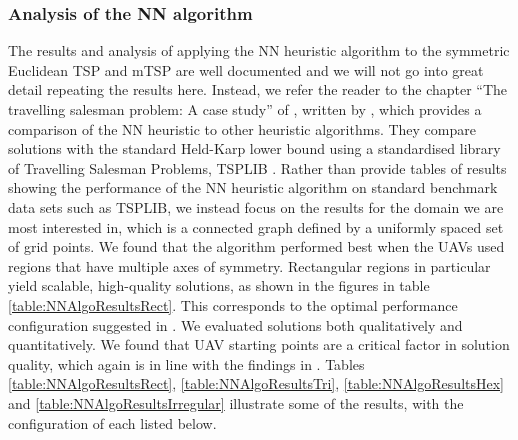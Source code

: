 


\subsubsection{Analysis of the NN algorithm}


The results and analysis of applying the NN heuristic algorithm to the symmetric Euclidean TSP and mTSP are well documented and we will not go into great detail repeating the results here. Instead, we refer the reader to the chapter ``The travelling salesman problem: A case study'' of \cite{Aarts:1997:LSC:549160}, written by \citeauthor{Johnson1995TheOptimization}, which provides a comparison of the NN heuristic to other heuristic algorithms. They compare solutions with the standard Held-Karp lower bound \cite{Held1962AProblems} using a standardised library of Travelling Salesman Problems, TSPLIB \cite{TSPLIB}. Rather than provide tables of results showing the performance of the NN heuristic algorithm on standard benchmark data sets such as TSPLIB, we instead focus on the results for the domain we are most interested in, which is a connected graph defined by a uniformly spaced set of grid points. We found that the algorithm performed best when the UAVs used regions that have multiple axes of symmetry. Rectangular regions in particular yield scalable, high-quality solutions, as shown in the figures in table \ref{table:NNAlgoResultsRect}. This corresponds to the optimal performance configuration suggested in \cite{Hungerlander2018TheGrids}. We evaluated solutions both qualitatively and  quantitatively. We found that UAV starting points are a critical factor in solution quality, which again is in line with the findings in \cite{Hungerlander2018TheGrids}. Tables \ref{table:NNAlgoResultsRect}, \ref{table:NNAlgoResultsTri}, \ref{table:NNAlgoResultsHex} and \ref{table:NNAlgoResultsIrregular} illustrate some of the results, with the configuration of each listed below.\\

